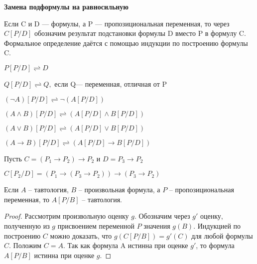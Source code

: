 \begin{center}
	\textbf{Замена подформулы на равносильную}
\end{center}

Если C и D — формулы, а P — пропозициональная
переменная, то через $C[P/D]$ обозначим результат подстановки формулы D вместо P в формулу C.
Формальное определение даётся с помощью индукции по построению
формулы C.
\begin{center}
	$P[P / D] \rightleftharpoons D$

	$Q[P / D] \rightleftharpoons Q,$ если Q— переменная, отличная от P

	$(\neg A)[P / D] \rightleftharpoons \neg(A[P / D]) $

	$(A \wedge B)[P / D] \rightleftharpoons(A[P / D] \wedge B[P / D])$

	$(A \vee B)[P / D] \rightleftharpoons(A[P / D] \vee B[P / D])$

	$(A \rightarrow B)[P / D] \rightleftharpoons(A[P / D] \rightarrow B[P / D])$

\end{center}

\begin{example}
	Пусть $C=\left(P_{1} \rightarrow P_{2}\right) \rightarrow P_{2} $ и $D=P_{3} \rightarrow P_{2}$

	$C\left[P_{2} / D\right]=\left(P_{1} \rightarrow\left(P_{3} \rightarrow P_{2}\right)\right)
	\rightarrow\left(P_{3} \rightarrow P_{2}\right)$

\end{example}


\begin{theorem}[О подставновке]
	Если $A$ -- тавтология, $B$ -- произвольная формула, а $P$ -- пропозициональная переменная, то $A[P/B]$
	-- тавтология.
\end{theorem}
\begin{proof}
	Рассмотрим произвольную оценку $g$. Обозначим через $g'$ оценку, полученную из $g$ присвоением переменной $P$
	значения $g(B)$. Индукцией по построению $C$ можно доказать, что $g(C[P/B])=g'(C)$  для любой формулы $C$.
	Положим $C=A$. Так как формула A истинна при оценке $g'$, то формула $A[P/B]$ истинна при оценке $g$.
\end{proof}

